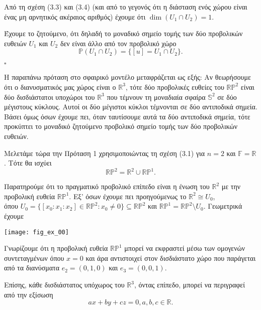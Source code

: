 \documentclass[12pt, a4paper]{book}
\begin{document}
Από τη σχέση (3.3) και (3.4) (και από το γεγονός ότι η διάσταση ενός χώρου είναι ένας μη αρνητικός ακέραιος αριθμός) έχουμε ότι $\dim{(U_1 \cap U_2)} = 1$. 

Έχουμε το ζητούμενο, ότι δηλαδή το μοναδικό σημείο τομής των δύο προβολικών ευθειών $U_1$ και $U_2$ δεν είναι άλλο από τον προβολικό χώρο
\begin{displaymath}
\mathbb{P} (U_1 \cap U_2)=\{ [u]=U_1 \cap U_2\}.
\end{displaymath}
\begin{flushright}
  $\square$
\end{flushright}

Η παραπάνω πρόταση στο σφαιρικό μοντέλο μεταφράζεται ως εξής:
Αν θεωρήσουμε ότι ο διανυσματικός μας χώρος είναι ο $\mathbb{R}^3$, τότε δύο προβολικές ευθείες του $\mathbb{R}\mathbb{P}^2$ είναι δύο δισδιάστατοι υποχώροι του  $\mathbb{R}^3$ που τέμνουν τη μοναδιαία σφαίρα $\mathbb{S}^2$ σε δύο μέγιστους κύκλους. Αυτοί οι δύο μέγιστοι κύκλοι τέμνονται σε δύο αντιποδικά σημεία. Βάσει όμως όσων έχουμε πει, όταν ταυτίσουμε αυτά τα δύο αντιποδικά σημεία, τότε προκύπτει το μοναδικό ζητούμενο προβολικό σημείο τομής των δύο προβολικών ευθειών.

Μελετάμε τώρα την Πρόταση 1 χρησιμοποιώντας τη σχέση (3.1) για $n=2$ και $\mathbb{F}=\mathbb{R}$. Τότε θα ισχύει
\begin{displaymath}
\mathbb{R}\mathbb{P}^2 = \mathbb{R}^2 \cup \mathbb{R}\mathbb{P}^{1}.
\end{displaymath} 

Παρατηρούμε ότι το πραγματικό προβολικό επίπεδο είναι η ένωση του $\mathbb{R}^2$ με την προβολική ευθεία $\mathbb{R}\mathbb{P}^1$. Εξ' όσων έχουμε πει προηγούμενως το $\mathbb{R}^2 \cong U_0$,\\όπου $U_0=\{[x_0:x_1:x_2]\in \mathbb{R}\mathbb{P}^2:x_0 \neq 0\} \subseteq \mathbb{R}\mathbb{P}^2$ και $\mathbb{R}\mathbb{P}^1=\mathbb{R}\mathbb{P}^2 \setminus U_0$. Γεωμετρικά έχουμε

\begin{center}
\texttt{[image: fig\_ex\_00]}
\end{center}

Γνωρίζουμε ότι η προβολική ευθεία $\mathbb{R}\mathbb{P}^1$ μπορεί να εκφραστεί μέσω των ομογενών συντεταγμένων όπου $x=0$ και άρα αντιστοιχεί στον δισδιάστατο χώρο που παράγεται από τα διανύσματα $e_2 = (0,1,0)$ και $e_3=(0,0,1)$.

Επίσης, κάθε δισδιάστατος υπόχωρος του $\mathbb{R}^3$, όντας επίπεδο, μπορεί να περιγραφεί από την εξίσωση
\begin{displaymath}
ax+by+cz =0 ,a,b,c \in \mathbb{R}.
\end{displaymath}
\end{document}
